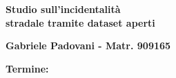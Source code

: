 \documentclass[a4paper]{article}
\begin{document}
    \begin{center}
    {\huge{\bf Studio sull'incidentalità}}\\
    \vspace{3mm}
    {\huge{\bf stradale tramite dataset aperti}}\\
    \end{center}
    \vspace{3mm}
    \begin{center}
    {\bf Gabriele Padovani - Matr. 909165}\\
    \end{center}
    \vspace{2mm}
    \begin{center}
    {\bf Termine:}\\
    \end{center}




\end{document}
